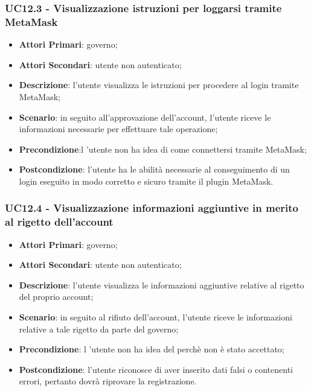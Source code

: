 \subsubsection{UC12.3 - Visualizzazione istruzioni per loggarsi tramite MetaMask\glo}
\begin{itemize}
	\item \textbf{Attori Primari}:
	governo;
	\item \textbf{Attori Secondari}:
	utente non autenticato;
	\item \textbf{Descrizione}: l'utente visualizza le istruzioni per procedere al login tramite MetaMask\glo;
	\item \textbf{Scenario}: in seguito all'approvazione dell'account, l'utente riceve le informazioni necessarie per effettuare tale operazione;
	\item \textbf{Precondizione}:l 'utente non ha idea di come connettersi tramite MetaMask\glo;
	\item \textbf{Postcondizione}: l'utente ha le abilità necessarie al conseguimento di un login eseguito in modo corretto e sicuro tramite il plugin MetaMask\glo.
\end{itemize}
\subsubsection{UC12.4 - Visualizzazione informazioni aggiuntive in merito al rigetto dell'account}
\begin{itemize}
	\item \textbf{Attori Primari}:
	governo;
	\item \textbf{Attori Secondari}:
	utente non autenticato;
	\item \textbf{Descrizione}: l'utente visualizza le informazioni aggiuntive relative al rigetto del proprio account;
	\item \textbf{Scenario}: in seguito al rifiuto dell'account, l'utente riceve le informazioni relative a tale rigetto da parte del governo;
	\item \textbf{Precondizione}: l 'utente non ha idea del perchè non è stato accettato;
	\item \textbf{Postcondizione}: l'utente riconosce di aver inserito dati falsi o contenenti errori, pertanto dovrà riprovare la registrazione.
\end{itemize}